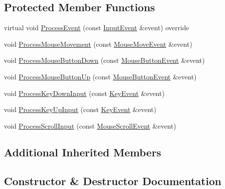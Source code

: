 \subsection*{Protected Member Functions}
\begin{DoxyCompactItemize}
\item 
virtual void \mbox{\hyperlink{classec_1_1_camera_controller_a0e2d455602581a484daf81bdb60a01bc}{Process\+Event}} (const \mbox{\hyperlink{structec_1_1_input_event}{Input\+Event}} \&event) override
\item 
void \mbox{\hyperlink{classec_1_1_camera_controller_a955335b57959a45bf2b67c02ed939dad}{Process\+Mouse\+Movement}} (const \mbox{\hyperlink{structec_1_1_mouse_move_event}{Mouse\+Move\+Event}} \&event)
\item 
void \mbox{\hyperlink{classec_1_1_camera_controller_ac96fb273f1f776558ec24a8cbdb2e476}{Process\+Mouse\+Button\+Down}} (const \mbox{\hyperlink{structec_1_1_mouse_button_event}{Mouse\+Button\+Event}} \&event)
\item 
void \mbox{\hyperlink{classec_1_1_camera_controller_af5c214b7775bca49f2b6e2acee2cd703}{Process\+Mouse\+Button\+Up}} (const \mbox{\hyperlink{structec_1_1_mouse_button_event}{Mouse\+Button\+Event}} \&event)
\item 
void \mbox{\hyperlink{classec_1_1_camera_controller_ab6057133b85ca670fa594d1d1cbadf0c}{Process\+Key\+Down\+Input}} (const \mbox{\hyperlink{structec_1_1_key_event}{Key\+Event}} \&event)
\item 
void \mbox{\hyperlink{classec_1_1_camera_controller_af205398ddb5e79bd64302e676ced3051}{Process\+Key\+Up\+Input}} (const \mbox{\hyperlink{structec_1_1_key_event}{Key\+Event}} \&event)
\item 
void \mbox{\hyperlink{classec_1_1_camera_controller_a5aef7fbf580d98ea998bb0f31d3f53aa}{Process\+Scroll\+Input}} (const \mbox{\hyperlink{structec_1_1_mouse_scroll_event}{Mouse\+Scroll\+Event}} \&event)
\end{DoxyCompactItemize}
\subsection*{Additional Inherited Members}


\subsection{Constructor \& Destructor Documentation}
\mbox{\label{classec_1_1_camera_controller_a53fd061c49374fd8f1194cecac1e35aa}} 
